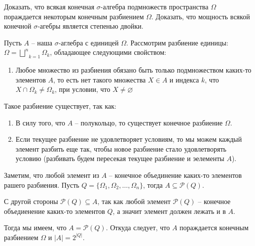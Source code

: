 \begin{task}{8}
Доказать, что всякая конечная $\sigma$-алгебра подмножеств пространства $\Omega$ пораждается некоторым конечным разбиением $\Omega$. Доказать, что мощность всякой конечной $\sigma$-агебры является степенью двойки.
\end{task}

\begin{solution}
Пусть $A$ -- наша $\sigma$-аглебра с единицей $\Omega$. Рассмотрим разбиение единицы: $\Omega = \underset{k=1}{\overset{n}{\bigsqcup}} \Omega_k$, обладающее следующими свойством:
\begin{enumerate}
    \item Любое множество из разбиения обязано быть только подмножеством каких-то элементов $A$, то есть нет такого множества $X \in A$ и индекса $k$, что $X \cap \Omega_k \neq \Omega_k$, при условии, что $X \neq \varnothing$
\end{enumerate}
Такое разбиение существует, так как:
\begin{enumerate}
    \item В силу того, что $A$ -- полукольцо, то существует конечное разбиение $\Omega$.
    
    \item Если текущее разбиение не удовлетворяет условиям, то мы можем каждый элемент разбить еще так, чтобы новое разбиение стало удовлетворять условию (разбивать будем пересекая текущее разбиение и эелементы $A$).
\end{enumerate}
Заметим, что любой элемент из $A$ -- конечное объединение каких-то элементов рашего разбиения. Пусть $Q = \lbrace \Omega_1, \Omega_2, \ldots, \Omega_n \rbrace$, тогда $A \subseteq \mathcal{P}(Q)$.

С другой стороны $\mathcal{P}(Q) \subseteq A$, так как любой элемент $\mathcal{P}(Q)$ -- конечное объедиенение каких-то элементов $Q$, а значит элемент должен лежать и в $A$.

Тогда мы имеем, что $A = \mathcal{P}(Q)$. Откуда следует, что $A$ пораждается конечным разбиением $\Omega$ и $|A| = 2^{|Q|}$.
\end{solution}